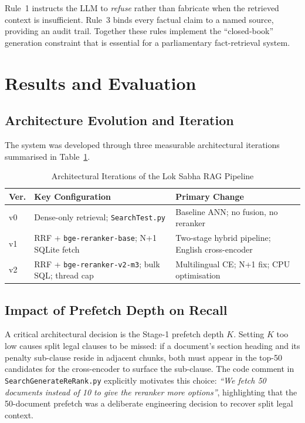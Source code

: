 \documentclass[conference]{IEEEtran}
\begin{document}
\noindent Rule~1 instructs the LLM to \emph{refuse} rather than fabricate
when the retrieved context is insufficient.
Rule~3 binds every factual claim to a named source, providing an audit trail.
Together these rules implement the ``closed-book'' generation constraint that
is essential for a parliamentary fact-retrieval system.

\section{Results and Evaluation}
\label{sec:results}

\subsection{Architecture Evolution and Iteration}

The system was developed through three measurable architectural iterations
summarised in Table~\ref{tab:evolution}.

\begin{table}[t]
  \caption{Architectural Iterations of the Lok Sabha RAG Pipeline}
  \label{tab:evolution}
  \centering
  \footnotesize
  \renewcommand{\arraystretch}{1.3}
  \begin{tabular}{@{}p{0.7cm}p{3.0cm}p{3.3cm}@{}}
    \toprule
    \textbf{Ver.} & \textbf{Key Configuration} & \textbf{Primary Change} \\
    \midrule
    v0 & Dense-only retrieval;
         \texttt{SearchTest.py}
       & Baseline ANN; no fusion, no reranker \\
    \addlinespace
    v1 & RRF + \texttt{bge-reranker-base};
         N+1 SQLite fetch
       & Two-stage hybrid pipeline; English cross-encoder \\
    \addlinespace
    v2 & RRF + \texttt{bge-reranker-v2-m3};
         bulk SQL; thread cap
       & Multilingual CE; N+1 fix; CPU optimisation \\
    \bottomrule
  \end{tabular}
  \renewcommand{\arraystretch}{1.0}
\end{table}

\subsection{Impact of Prefetch Depth on Recall}

A critical architectural decision is the Stage-1 prefetch depth $K$.
Setting $K$ too low causes split legal clauses to be missed: if a document's
section heading and its penalty sub-clause reside in adjacent chunks, both
must appear in the top-50 candidates for the cross-encoder to surface the
sub-clause.
The code comment in \texttt{SearchGenerateReRank.py} explicitly motivates this
choice: \textit{``We fetch 50 documents instead of 10 to give the reranker
more options''}, highlighting that the 50-document prefetch was a deliberate
engineering decision to recover split legal context.
\end{document}
